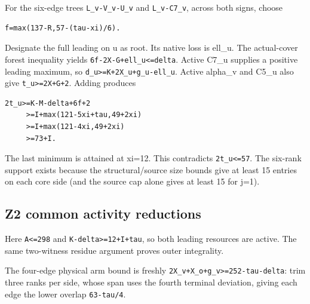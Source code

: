 \documentclass[10pt,a4paper]{article}
\theoremstyle{definition}
\begin{document}
For the six-edge trees \texttt{L\_\allowbreak{}\allowbreak{}v-V\_\allowbreak{}\allowbreak{}v-U\_\allowbreak{}\allowbreak{}v} and
\texttt{L\_\allowbreak{}\allowbreak{}v-C7\_\allowbreak{}\allowbreak{}v},\allowbreak{} across both signs,\allowbreak{} choose

\begin{lstlisting}
f=max(137-R,57-(tau-xi)/6).
\end{lstlisting}

Designate the full leading on u as root. Its native loss is ell\_\allowbreak{}u. The
actual-cover forest inequality yields
\texttt{6f-2X-G+\allowbreak{}ell\_\allowbreak{}\allowbreak{}u<=\allowbreak{}delta}. Active C7\_\allowbreak{}u supplies a
positive leading maximum,\allowbreak{} so
\texttt{d\_\allowbreak{}\allowbreak{}u>=\allowbreak{}K+\allowbreak{}2X\_\allowbreak{}\allowbreak{}u+\allowbreak{}g\_\allowbreak{}\allowbreak{}u-ell\_\allowbreak{}\allowbreak{}u}. Active alpha\_\allowbreak{}v and
C5\_\allowbreak{}u also give \texttt{t\_\allowbreak{}\allowbreak{}u>=\allowbreak{}2X+\allowbreak{}G+\allowbreak{}2}. Adding produces

\begin{lstlisting}
2t_u>=K-M-delta+6f+2
     >=I+max(121-5xi+tau,49+2xi)
     >=I+max(121-4xi,49+2xi)
     >=73+I.
\end{lstlisting}

The last minimum is attained at xi=\allowbreak{}12. This contradicts
\texttt{2t\_\allowbreak{}\allowbreak{}u<=\allowbreak{}57}. The six-rank support exists because
the structural/source size bounds give at least 15 entries on each core
side (and the source cap alone gives at least 15 for j=\allowbreak{}1).

\hypertarget{z2-common-activity-reductions}{%
\subsection{Z2 common activity
reductions}\label{z2-common-activity-reductions}}

Here \texttt{A<=\allowbreak{}298} and
\texttt{K-delta>=\allowbreak{}12+\allowbreak{}I+\allowbreak{}tau},\allowbreak{} so both leading resources
are active. The same two-witness residue argument proves outer
integrality.

The four-edge physical arm bound is freshly
\texttt{2X\_\allowbreak{}\allowbreak{}v+\allowbreak{}X\_\allowbreak{}\allowbreak{}o+\allowbreak{}g\_\allowbreak{}\allowbreak{}v>=\allowbreak{}252-tau-delta}: trim three
ranks per side,\allowbreak{} whose span uses the fourth terminal deviation,\allowbreak{} giving
each edge the lower overlap \texttt{63-tau/\allowbreak{}4}.
\end{document}
